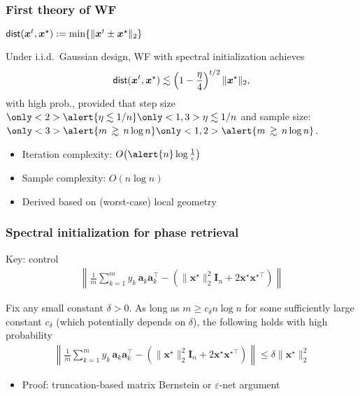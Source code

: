 \documentclass[compress,
mathserif,wide,%
]{beamer}
\begin{document}
\begin{frame}
	\frametitle{First theory of WF}

	

 
\hfill $\mathsf{dist}(\bm{x}^t, \bm{x}^{\star}) := \min \{ \|\bm{x}^t \pm \bm{x}^{\star} \|_2 \}$


\begin{theorem}
Under i.i.d.~Gaussian design, WF with spectral initialization achieves
\[
	\mathsf{dist}(\bm{x}^t, \bm{x}^{\star}) \lesssim \left( 1 - \frac{\eta}{4} \right)^{t/2} \|\bm{x}^{\star} \|_2, 
\]
%
with high prob., 
	provided that step size $\only<2>{\alert{\eta \lesssim 1/n}}\only<1,3>{\eta \lesssim 1/n}$ and
	sample size: $ \only<3>{\alert{m\,\gtrsim\, n\log n}}\only<1,2>{\alert{m\,\gtrsim\, n\log n}} $.
\end{theorem}
%

%
\begin{itemize}
  \itemsep0.5em
  \item Iteration complexity:  $O\big(\alert{n} \log\frac{1}{\epsilon}\big)$  
  \item Sample complexity: $O(n\log n)$
  \item Derived based on (worst-case) local geometry 
\end{itemize}

\end{frame}

\begin{frame}
	\frametitle{Spectral initialization for phase retrieval}
	 Key: control
		\begin{align*}
			\left \| \frac{1}{m}\sum_{k=1}^m y_k \,
		\bm{a}_k\bm{a}_k^{\top} - ( \| \bm{x}^\star \|_{2}^2 \bm{I}_{n} + 2 \bm{x}^\star \bm{x}^{\star \top} ) \right\|
		\end{align*}
		
	\begin{lemma}\label{lemma:pr-concentration}
	Fix any small constant $\delta > 0$. As long as $m \geq c_{\delta} n \log n$ for some sufficiently large constant $c_{\delta}$ (which potentially depends on $\delta$), the following holds with high probability
	\begin{align*}
	\left \| \frac{1}{m}\sum_{k=1}^m y_k \,
		\bm{a}_k\bm{a}_k^{\top} - ( \| \bm{x}^\star \|_{2}^2 \bm{I}_{n} + 2 \bm{x}^\star \bm{x}^{\star \top} ) \right\| \leq \delta \| \bm{x}^\star \|_{2}^2
	\end{align*}
	\end{lemma}
	
	\vfill
	\begin{itemize}
		\item Proof: truncation-based matrix Bernstein or $\varepsilon$-net  argument
	\end{itemize}
\end{frame}
\end{document}
